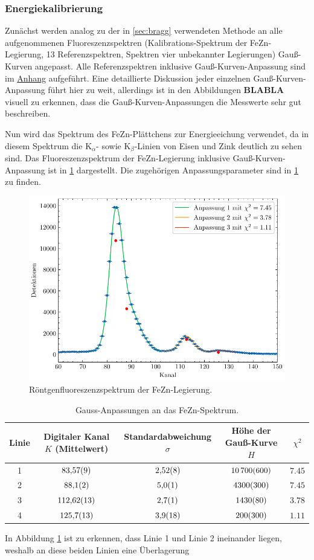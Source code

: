 \subsubsection*{Energiekalibrierung}\label{subsubsec:energie_kali}
Zunächst werden analog zu der in \cref{sec:bragg} verwendeten Methode an alle aufgenommenen Fluoreszenzspektren (Kalibrations-Spektrum der FeZn-Legierung, 13 Referenzspektren, Spektren vier unbekannter Legierungen)
Gauß-Kurven angepasst. Alle Referenzspektren inklusive Gauß-Kurven-Anpassung sind im \hyperref[sec:anhang]{Anhang} aufgeführt. Eine detaillierte Diskussion
jeder einzelnen Gauß-Kurven-Anpassung führt hier zu weit, allerdings ist in den Abbildungen \textbf{BLABLA} visuell zu erkennen, dass die Gauß-Kurven-Anpassungen
die Messwerte sehr gut beschreiben.\par
Nun wird das Spektrum des FeZn-Plättchens zur Energieeichung verwendet, da in diesem Spektrum die $\mathrm{K}_{\alpha}$- sowie $\mathrm{K}_{\beta}$-Linien
von Eisen und Zink deutlich zu sehen sind. Das Fluoreszenzspektrum der FeZn-Legierung inklusive Gauß-Kurven-Anpassung ist in \cref{fig:fezn} dargestellt.
Die zugehörigen Anpassungsparameter sind in \cref{tab:fezn-gauss-fits} zu finden.
\begin{figure}[H]
	\centering
	\includegraphics[width=0.6\linewidth]{../figs/FeZn.pdf}
	\caption{Röntgenfluoreszenzspektrum der FeZn-Legierung.}
	\label{fig:fezn}
\end{figure}
\begin{table}[H]
    \centering
 \caption{Gauss-Anpassungen an das FeZn-Spektrum.}
 \begin{tabular}{c c c c c}
 \hline Linie & Digitaler Kanal $K$ (Mittelwert) & Standardabweichung $\sigma$ & Höhe der Gauß-Kurve $H$ & $\chi^2$ \\ 
 \hline
 1 & $\num{83.57\pm 0.09}$ & $\num{2.52\pm 0.08}$ & $\num{10700\pm 600}$ & $\num{7.45}$ \\
 2 & $\num{88.1\pm 0.2}$ & $\num{5.0\pm 0.1}$ & $\num{4300\pm 300}$ & $\num{7.45}$ \\
 3 & $\num{112.62\pm 0.13}$ & $\num{2.7\pm 0.1}$ & $\num{1430\pm 80}$ & $\num{3.78}$ \\
 4 & $\num{125.7\pm 1.3}$ & $\num{3.9\pm 1.8}$ & $\num{200\pm 300}$ & $\num{1.11}$ \\
 \hline\end{tabular}
 \label{tab:fezn-gauss-fits}
\end{table} In Abbildung \cref{fig:fezn} ist zu erkennen, dass Linie 1 und Linie 2 ineinander liegen, weshalb an diese beiden Linien eine Überlagerung
